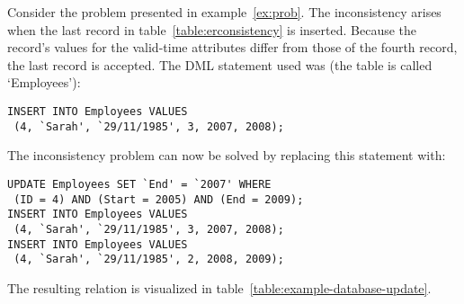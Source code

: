 \begin{example}
Consider the problem presented in example~\ref{ex:prob}. The inconsistency arises when the last record in table~\ref{table:erconsistency} is inserted. Because the record's values for the valid-time attributes differ from those of the fourth record, the last record is accepted. The DML statement used was (the table is called `Employees'):

\begin{verbatim}
INSERT INTO Employees VALUES
 (4, `Sarah', `29/11/1985', 3, 2007, 2008);
\end{verbatim}

\noindent
The inconsistency problem can now be solved by replacing this statement with:

\begin{verbatim}
UPDATE Employees SET `End' = `2007' WHERE
 (ID = 4) AND (Start = 2005) AND (End = 2009);
INSERT INTO Employees VALUES
 (4, `Sarah', `29/11/1985', 3, 2007, 2008);
INSERT INTO Employees VALUES
 (4, `Sarah', `29/11/1985', 2, 2008, 2009);
\end{verbatim}

\noindent
The resulting relation is visualized in table~\ref{table:example-database-update}.

\end{example}




